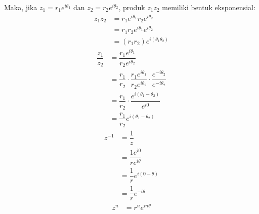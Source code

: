 \documentclass{article}
\begin{document}
    Maka, jika $z_1 = r_1e^{i\theta_1}$ dan $z_2 = r_2e^{i\theta_2}$, produk $z_1z_2$ memiliki bentuk eksponensial:
    \begin{align}
        z_1z_2  &= r_1e^{i\theta_1} r_2e^{i\theta_2}
                \nonumber\\
                &= r_1r_2e^{i\theta_1}e^{i\theta_2}
                \nonumber\\
                &= (r_1r_2)e^{i(\theta_1\theta_2)}
    \end{align}
    \begin{align}
        \dfrac{z_1}{z_2}    &= \dfrac{r_1e^{i\theta_1}}{r_2e^{i\theta_2}}
                            \nonumber\\
                            &= \dfrac{r_1}{r_2} \cdot \dfrac{r_1e^{i\theta_1}}{r_2e^{i\theta_2}} \cdot \dfrac{e^{-i\theta_2}}{e^{-i\theta_2}}
                            \nonumber\\
                            &= \dfrac{r_1}{r_2} \cdot \dfrac{e^{i(\theta_1-\theta_2)}}{e^{i0}}
                            \nonumber\\
                            &= \dfrac{r_1}{r_2} e^{i(\theta_1-\theta_2)}
    \end{align}
    \begin{align}
        z^{-1}  &= \dfrac{1}{z}
                \nonumber\\
                &= \dfrac{1e^{i0}}{re^{i\theta}}
                \nonumber\\
                &= \dfrac{1}{r} e^{i(0-\theta)}
                \nonumber\\
                &= \dfrac{1}{r} e^{-i\theta}
    \end{align}
    \begin{align}
        z^n &= r^n e^{in\theta}
    \end{align}
\end{document}
